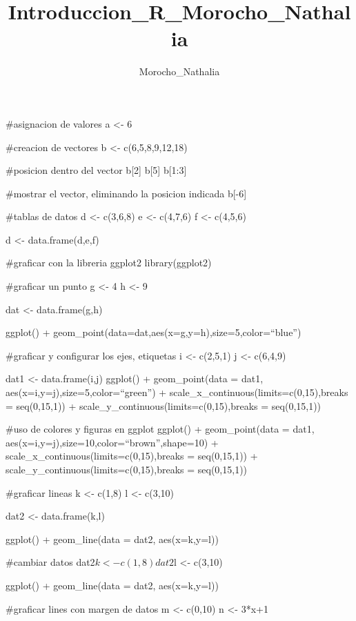 \documentclass[
  letterpaper,
  DIV=11,
  numbers=noendperiod]{scrartcl}
\title{Introduccion\_R\_Morocho\_Nathalia}
\author{Morocho\_Nathalia}
\date{}
\begin{document}
\maketitle
\ifdefined\Shaded\renewenvironment{Shaded}{\begin{tcolorbox}[frame hidden, breakable, interior hidden, boxrule=0pt, enhanced, sharp corners, borderline west={3pt}{0pt}{shadecolor}]}{\end{tcolorbox}}\fi

\#asignacion de valores a \textless- 6

\#creacion de vectores b \textless- c(6,5,8,9,12,18)

\#posicion dentro del vector b{[}2{]} b{[}5{]} b{[}1:3{]}

\#mostrar el vector, eliminando la posicion indicada b{[}-6{]}

\#tablas de datos d \textless- c(3,6,8) e \textless- c(4,7,6) f
\textless- c(4,5,6)

d \textless- data.frame(d,e,f)

\#graficar con la libreria ggplot2 library(ggplot2)

\#graficar un punto g \textless- 4 h \textless- 9

dat \textless- data.frame(g,h)

ggplot() + geom\_point(data=dat,aes(x=g,y=h),size=5,color=``blue'')

\#graficar y configurar los ejes, etiquetas i \textless- c(2,5,1) j
\textless- c(6,4,9)

dat1 \textless- data.frame(i,j) ggplot() + geom\_point(data = dat1,
aes(x=i,y=j),size=5,color=``green'') +
scale\_x\_continuous(limits=c(0,15),breaks = seq(0,15,1)) +
scale\_y\_continuous(limits=c(0,15),breaks = seq(0,15,1))

\#uso de colores y figuras en ggplot ggplot() + geom\_point(data = dat1,
aes(x=i,y=j),size=10,color=``brown'',shape=10) +
scale\_x\_continuous(limits=c(0,15),breaks = seq(0,15,1)) +
scale\_y\_continuous(limits=c(0,15),breaks = seq(0,15,1))

\#graficar lineas k \textless- c(1,8) l \textless- c(3,10)

dat2 \textless- data.frame(k,l)

ggplot() + geom\_line(data = dat2, aes(x=k,y=l))

\#cambiar datos dat2\(k <- c(1,8) dat2\)l \textless- c(3,10)

ggplot() + geom\_line(data = dat2, aes(x=k,y=l))

\#graficar lines con margen de datos m \textless- c(0,10) n \textless-
3*x+1
\end{document}
